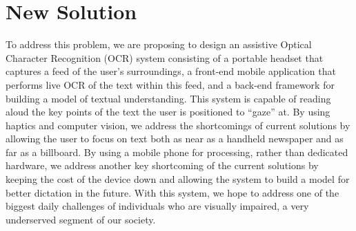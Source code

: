 \section{New Solution}

To address this problem, we are proposing to design an assistive Optical Character Recognition (OCR) system consisting of a portable headset that captures a feed of the user’s surroundings, a front-end mobile application that performs live OCR of the text within this feed, and a back-end framework for building a model of textual understanding. This system is capable of reading aloud the key points of the text the user is positioned to “gaze” at. By using haptics and computer vision, we address the shortcomings of current solutions by allowing the user to focus on text both as near as a handheld newspaper and as far as a billboard. By using a mobile phone for processing, rather than dedicated hardware, we address another key shortcoming of the current solutions by keeping the cost of the device down and allowing the system to build a model for better dictation in the future. With this system, we hope to address one of the biggest daily challenges of individuals who are visually impaired, a very underserved segment of our society.